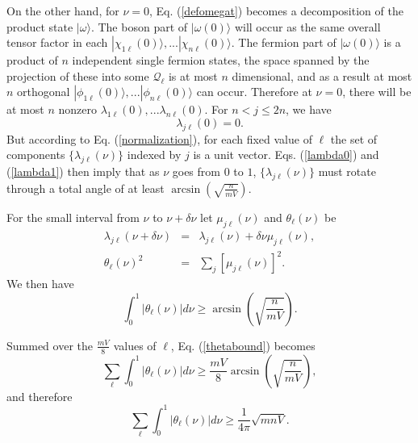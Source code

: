 \documentclass[twocolumn,amsmath,amssymb]{revtex4-1}
\begin{document}
On the other hand, for $\nu = 0$, Eq. (\ref{defomegat}) becomes a decomposition of 
the product state $|\omega \rangle $. The boson part of
$|\omega(0) \rangle $ will occur as the same overall tensor
factor in each $|\chi_{1\ell}(0) \rangle ,... |\chi_{n\ell}(0) \rangle $.
The fermion part of $|\omega(0) \rangle $
is a product of 
$n$ independent single fermion states,
the space spanned by the projection of these 
into some $\mathcal{Q}_\ell$ is at most $n$ dimensional,
and as a result at most
$n$ orthogonal $|\phi_{1\ell}(0) \rangle ,... |\phi_{n\ell}(0) \rangle $ can occur.
Therefore
at $\nu = 0$, there will be at most $n$ nonzero 
$\lambda_{1\ell}(0), ... \lambda_{n\ell}(0)$. For
$n < j \le 2n$, we have
\begin{equation}
\label{lambda0}
\lambda_{j\ell}( 0) = 0.
\end{equation}
But according to Eq. (\ref{normalization}),
for each fixed value
of $\ell$
the set of components $\{\lambda_{j\ell}( \nu)\}$
indexed by $j$ is a unit vector.
Eqs. (\ref{lambda0}) and (\ref{lambda1}) then imply that
as $\nu$ goes from $0$ to $1$,
$\{\lambda_{j\ell}( \nu)\}$ 
must rotate through a total angle of at least $\arcsin(\sqrt{\frac{n}{mV}})$.



For the small interval from $\nu$ to $\nu + \delta \nu$ let
$\mu_{j\ell}(\nu)$ and $\theta_{\ell}(\nu)$ be 
\begin{subequations}
\begin{eqnarray}
\label{mudeltat}
\lambda_{j\ell}(\nu + \delta \nu) & = & \lambda_{j\ell}( \nu ) + \delta \nu \mu_{j\ell}(\nu), \\
\label{thetaoft}
\theta_{\ell}( \nu)^2 & = & \sum_j [ \mu_{j\ell}(\nu)]^2. 
\end{eqnarray}
\end{subequations}
We then have
\begin{equation}
\label{thetabound}
\int_0^1 | \theta_{\ell}(\nu)| d \nu \ge \arcsin\left(\sqrt{\frac{n}{mV}} \right).
\end{equation}

Summed over the $\frac{mV}{8}$ values of $\ell$,
Eq. (\ref{thetabound}) becomes
\begin{equation}
\label{thetaboundsum}
\sum_{\ell} \int_0^1 | \theta_{\ell}(\nu)| d \nu  \ge 
\frac{ m V}{8} \arcsin\left(\sqrt{\frac{n}{mV}} \right),
\end{equation}
and therefore
\begin{equation}
\label{thetaboundsum1}
\sum_{\ell} \int_0^1 | \theta_{\ell}(\nu)| d \nu
\ge \frac{1}{4\pi} \sqrt{mnV}.
\end{equation}
\end{document}
